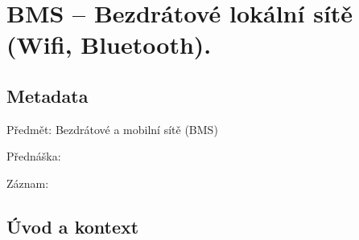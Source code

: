 

\chapter{BMS -- Bezdrátové lokální sítě (Wifi, Bluetooth).}



\section{Metadata}

\begin{compactitem}
    \item Předmět: Bezdrátové a mobilní sítě (BMS)
    \item Přednáška:
    \begin{compactitem}
        \item {}
    \end{compactitem}
    \item Záznam:
    \begin{compactitem}
        \item {}
    \end{compactitem}
\end{compactitem}


\section{Úvod a kontext}

